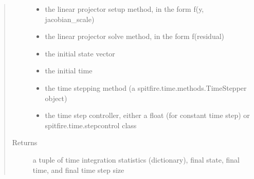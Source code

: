 \documentclass[letterpaper,10pt,english]{sphinxmanual}
\begin{document}
\begin{fulllineitems}
\begin{fulllineitems}
\begin{quote}
\begin{description}
\begin{itemize}
\item {} 
 \textendash{} the linear projector setup method, in the form f(y, jacobian\_scale)

\item {} 
 \textendash{} the linear projector solve method, in the form f(residual)

\item {} 
 \textendash{} the initial state vector

\item {} 
 \textendash{} the initial time

\item {} 
 \textendash{} the time stepping method (a spitfire.time.methods.TimeStepper object)

\item {} 
 \textendash{} the time step controller, either a float (for constant time step) or spitfire.time.stepcontrol class

\end{itemize}

\item[{Returns}] \leavevmode
a tuple of time integration statistics (dictionary), final state, final time, and final time step size

\end{description}\end{quote}

\end{fulllineitems}


\begin{fulllineitems}
\label{\detokenize{spitfire.time.governor:spitfire.time.governor.Governor.termination_criteria}}~
\end{fulllineitems}


\end{fulllineitems}

\end{document}
